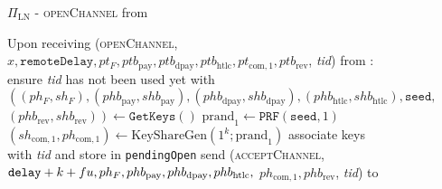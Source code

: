   \begin{figure}[H]
    \begin{protocolbox}{$\Pi_{\mathrm{LN}}$ - \textsc{openChannel} from \bob}
      \begin{algorithmic}[1]
        \State Upon receiving (\textsc{openChannel}, $x, \mathtt{remoteDelay},
        pt_F, ptb_{\mathrm{pay}}, ptb_{\mathrm{dpay}}, ptb_{\mathrm{htlc}},
        pt_{\mathrm{com}, 1}, ptb_{\mathrm{rev}}$, \textit{tid}) from \bob:
        \Indent
          \State ensure \textit{tid} has not been used yet with \bob
          \State $\left(\left(ph_F, sh_F\right), \left(phb_{\mathrm{pay}},
          shb_{\mathrm{pay}}\right), \left(phb_{\mathrm{dpay}},
          shb_{\mathrm{dpay}}\right), \left(phb_{\mathrm{htlc}},
          shb_{\mathrm{htlc}}\right), \mathtt{seed},\right.$
          $\left.\left(phb_{\mathrm{rev}}, shb_{\mathrm{rev}}\right)\right)
          \gets \texttt{GetKeys}\left(\right)$
          \State $\mathrm{prand}_1 \gets \texttt{PRF}\left(\mathtt{seed},
          1\right)$
          \State $\left(sh_{\mathrm{com}, 1}, ph_{\mathrm{com}, 1}\right) \gets
          \mathrm{KeyShareGen}\left(1^k; \mathrm{prand}_1\right)$
          \State associate keys with \textit{tid} and store in
          \texttt{pendingOpen}
          \label{alg:protocol:open:openChannel:pendingOpen}
          \State send (\textsc{acceptChannel}, $\mathtt{delay} + k + fu,
          ph_F, phb_{\mathrm{pay}}, phb_{\mathrm{dpay}}, phb_{\mathrm{htlc}},$
          $ph_{\mathrm{com}, 1}, phb_{\mathrm{rev}}$, \textit{tid}) to \bob{}
        \EndIndent
      \end{algorithmic}
    \end{protocolbox}
    \caption{}
    \label{alg:protocol:open:openChannel}
  \end{figure}


